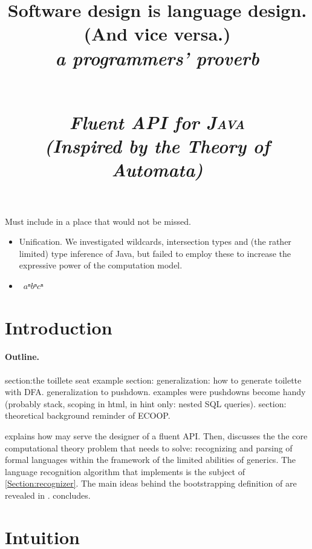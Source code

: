 \documentclass[nonatbib,preprint,numbers]{sigplanconf}
\title{%
\begin{flushright}
  \scriptsize\bfseries
  Software design is language design. \\
    (And vice versa.) \\
  \footnotesize\mdseries\itshape
   a programmers' proverb
\end{flushright}
  \Huge \Fajita \\ 
  \huge \itshape \textbf Fluent \textbf API for \textsc{\textbf Java} \\
  \LARGE (\textbf Inspired by the \textbf Theory of \textbf Automata)
}
\begin{document}
\maketitle

\begin{abstract}
  
\end{abstract}

Must include in a place that would not be missed.
\begin{itemize}
  \item \Prolog Unification.  We investigated wildcards, intersection types and
        (the rather limited) type inference of Java, but failed to employ these to
        increase the expressive power of the computation model.
        \item~$aⁿbⁿcⁿ$
\end{itemize}

\section{Introduction}


\paragraph{Outline.} 
section:the toillete seat example
section: generalization:
  how to generate toilette with DFA.
  generalization to pushdown.
  examples were pushdowns become handy (probably stack, scoping in html, in hint only: nested SQL queries).
section: theoretical background
reminder of ECOOP.



  explains how \Fajita may serve the designer of a fluent API. 
Then,  discusses the 
  the core computational theory problem that \Fajita 
  needs to solve: recognizing and parsing of formal languages
  within the framework of the limited abilities of \Java
  generics.
The language recognition algorithm that \Fajita
  implements is the subject of \cref{Section:recognizer}.
The main ideas behind the bootstrapping definition of \Self 
  are revealed in . 
 concludes. 



\section{Intuition}

\end{document}
